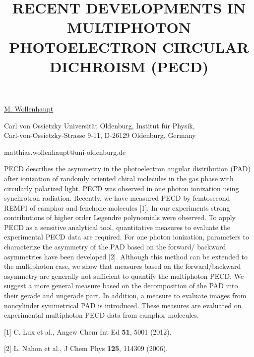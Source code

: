 \title{RECENT DEVELOPMENTS IN MULTIPHOTON PHOTOELECTRON CIRCULAR DICHROISM (PECD)}

\underline{M. Wollenhaupt} 

{\normalsize{\vspace{-4mm}
Carl von Ossietzky Universit\"{a}t Oldenburg, Institut f\"{u}r Physik,\\
Carl-von-Ossietzky-Strasse 9-11,
D-26129 Oldenburg,
Germany

\email matthias.wollenhaupt@uni-oldenburg.de}}

PECD describes the asymmetry in the photoelectron angular distribution (PAD) after ionization of randomly oriented chiral molecules in the gas phase with circularly polarized light. PECD was observed in one photon ionization using synchrotron radiation. Recently, we have measured PECD by femtosecond REMPI of camphor and fenchone molecules [1]. In our experiments strong contributions of higher order Legendre polynomials were observed. To apply PECD as a sensitive analytical tool, quantitative measures to evaluate the experimental PECD data are required. For one photon ionization, parameters to characterize the asymmetry of the PAD based on the forward/ backward asymmetries have been developed [2]. Although this method can be extended to the multiphoton case, we show that measures based on the forward/backward asymmetry are generally not sufficient to quantify the multiphoton PECD. We suggest a more general measure based on the decomposition of the PAD into their gerade and ungerade part. In addition, a measure to evaluate images from noncylinder symmetrical PAD is introduced. These measures are evaluated on experimental multiphoton PECD data from camphor molecules.


{\normalsize
[1]  C. Lux et al., Angew Chem Int Ed \textbf{51}, 5001 (2012).
\vsp

[2] L. Nahon et al., J Chem Phys \textbf{125}, 114309 (2006).
}

\vspace{\baselineskip}
